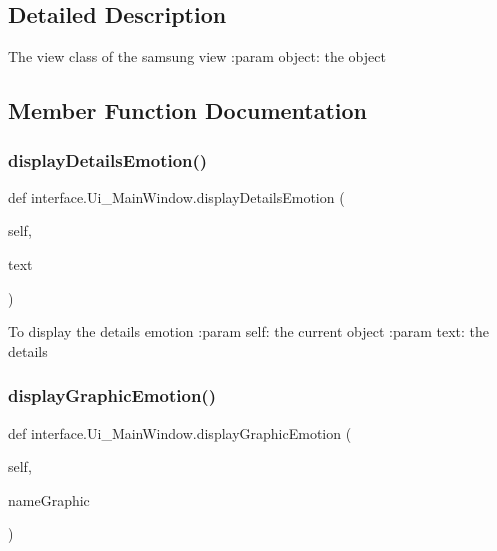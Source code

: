 \subsection{Detailed Description}
\begin{DoxyVerb}    The view class of the samsung view
    :param object: the object
\end{DoxyVerb}
 

\subsection{Member Function Documentation}
\mbox{\label{classinterface_1_1_ui___main_window_a513a331cd4e15cd50c7154c9a6349ba5}} 
\subsubsection{\texorpdfstring{display\+Details\+Emotion()}{displayDetailsEmotion()}}
{\footnotesize\ttfamily def interface.\+Ui\+\_\+\+Main\+Window.\+display\+Details\+Emotion (\begin{DoxyParamCaption}\item[{}]{self,  }\item[{}]{text }\end{DoxyParamCaption})}

\begin{DoxyVerb}To display the details emotion
:param self: the current object
:param text: the details
\end{DoxyVerb}
 \mbox{\label{classinterface_1_1_ui___main_window_a6607be83da848f1379b3aac3f794ab7c}} 
\subsubsection{\texorpdfstring{display\+Graphic\+Emotion()}{displayGraphicEmotion()}}
{\footnotesize\ttfamily def interface.\+Ui\+\_\+\+Main\+Window.\+display\+Graphic\+Emotion (\begin{DoxyParamCaption}\item[{}]{self,  }\item[{}]{name\+Graphic }\end{DoxyParamCaption})}

